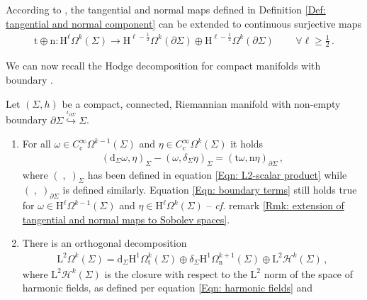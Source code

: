 \begin{remark}\label{Rmk: extension of tangential and normal maps to Sobolev spaces}
	According to \cite[p. 171]{Georgescu-79}, the tangential and normal maps defined in Definition \ref{Def: tangential and normal component} can be extended to continuous surjective maps
	\begin{align}\label{Eqn: Sobolev tangential and normal trace maps}
		\mathrm{t}\oplus\mathrm{n}\colon
		\mathrm{H}^\ell\Omega^k(\Sigma)\to
		\mathrm{H}^{\ell-\frac{1}{2}}\Omega^k(\partial\Sigma)\oplus
		\mathrm{H}^{\ell-\frac{1}{2}}\Omega^k(\partial\Sigma)\,\qquad\forall\ell\geq\frac{1}{2}\,.
	\end{align}
\end{remark}
We can now recall the Hodge decomposition for compact manifolds with boundary \cite[Thm. 2.4.2]{Schwarz-95}.
\begin{theorem}\label{Thm: Hodge decomposition for manifolds with boundary}
	Let $(\Sigma,h)$ be a compact, connected, Riemannian manifold with non-empty boundary $\partial\Sigma\stackrel{\iota_{\partial\Sigma}}{\hookrightarrow}\Sigma$.
	\begin{enumerate}
		\item
		For all $\omega\in C^{\infty}_{\mathrm{c}}\Omega^{k-1}(\Sigma)$ and $\eta\in C^{\infty}_{\mathrm{c}}\Omega^{k}(\Sigma)$ it holds
		\begin{align}\label{Eqn: boundary terms}
			(\mathrm{d}_\Sigma\omega,\eta)_\Sigma-(\omega,\delta_\Sigma\eta)_\Sigma=
			(\mathrm{t}\omega,\mathrm{n}\eta)_{\partial\Sigma}\,,
		\end{align}
		where $(\;,\;)_\Sigma$ has been defined in equation \eqref{Eqn: L2-scalar product} while $(\;,\;)_{\partial\Sigma}$ is defined similarly.
		Equation \eqref{Eqn: boundary terms} still holds true for $\omega\in \mathrm{H}^\ell\Omega^{k-1}(\Sigma)$ and $\eta\in \mathrm{H}^\ell\Omega^{k}(\Sigma)$ -- \textit{cf.} remark \ref{Rmk: extension of tangential and normal maps to Sobolev spaces}.
		\item
		There is an orthogonal decomposition
		\begin{align}\label{Eqn: Hodge decomposition for manifold with boundary}
			\mathrm{L}^2\Omega^k(\Sigma)=
			\mathrm{d}_\Sigma \mathrm{H}^1\Omega^k_{\mathrm{t}}(\Sigma)\oplus
			\delta_\Sigma \mathrm{H}^1\Omega^{k+1}_{\mathrm{n}}(\Sigma)
			\oplus\mathrm{L}^2\mathcal{H}^k(\Sigma)\,,		
		\end{align}
		where $\mathrm{L}^2\mathcal{H}^k(\Sigma)$ is the closure with respect to the $\mathrm{L}^2$ norm of the space of harmonic fields, as defined per equation \eqref{Eqn: harmonic fields} and

\end{enumerate}
\end{theorem}
